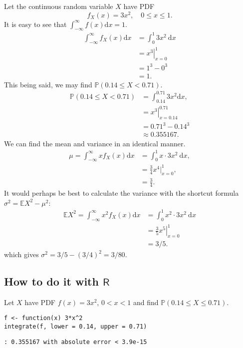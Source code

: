 \label{exa-cont-pdf3x2} Let the continuous random variable \(X\) have PDF
\[ f_{X}(x)=3x^{2},\quad 0\leq x\leq 1. \]
It is easy to
see that \(\int_{-\infty}^{\infty}f(x)\mathrm{d} x=1\).
\begin{align*}
\int_{-\infty}^{\infty}f_{X}(x)\mathrm{d} x & =\int_{0}^{1}3x^{2}\:\mathrm{d} x\\
 & =\left.x^{3}\right|_{x=0}^{1}\\
 & =1^{3}-0^{3}\\
 & =1.
\end{align*}
This being said, we may find \(\mathbb{P}(0.14\leq X<0.71)\).
\begin{align*}
\mathbb{P}(0.14\leq X<0.71) & =\int_{0.14}^{0.71}3x^{2}\mathrm{d} x,\\
 & =\left.x^{3}\right|_{x=0.14}^{0.71}\\
 & =0.71^{3}-0.14^{3}\\
 & \approx0.355167.
\end{align*}
We can find the mean and variance in an identical manner.
\begin{align*}
\mu=\int_{-\infty}^{\infty}xf_{X}(x)\mathrm{d} x & =\int_{0}^{1}x\cdot3x^{2}\:\mathrm{d} x,\\
 & =\frac{3}{4}x^{4}|_{x=0}^{1},\\
 & =\frac{3}{4}.
\end{align*}
It would perhaps be best to calculate the variance with the shortcut
formula \(\sigma^{2}=\mathbb{E} X^{2}-\mu^{2}\):
\begin{align*}
\mathbb{E} X^{2}=\int_{-\infty}^{\infty}x^{2}f_{X}(x)\mathrm{d} x & =\int_{0}^{1}x^{2}\cdot3x^{2}\:\mathrm{d} x\\
 & =\left.\frac{3}{5}x^{5}\right|_{x=0}^{1}\\
 & =3/5.
\end{align*}
which gives \(\sigma^{2}=3/5-(3/4)^{2}=3/80\).

\subsection{How to do it with \(\mathsf{R}\)}
\label{sec-6-1-2-1}

Let \(X\) have PDF \(f(x)=3x^{2}\), \(0<x<1\) and find
\(\mathbb{P}(0.14\leq X\leq0.71)\).

\begin{Verbatim}
f <- function(x) 3*x^2
integrate(f, lower = 0.14, upper = 0.71)
\end{Verbatim}

\begin{verbatim}
: 0.355167 with absolute error < 3.9e-15
\end{verbatim}

